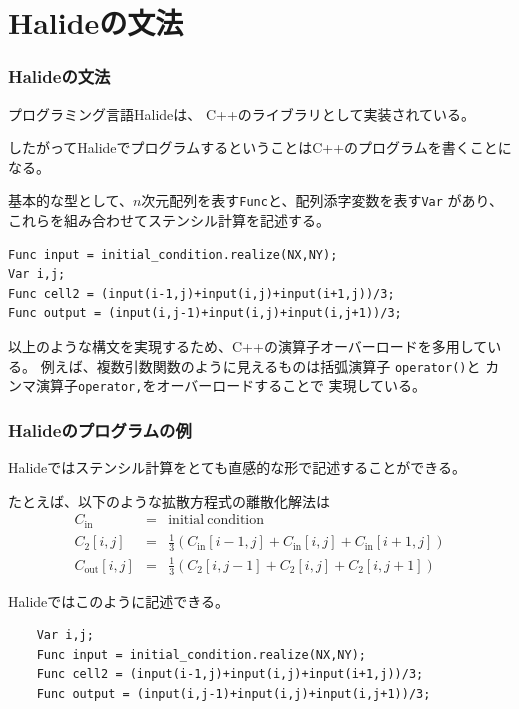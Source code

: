 \documentclass[dvipdfmx,cjk]{beamer}
\begin{document}
\section{Halideの文法} 
\begin{frame}[fragile]\frametitle{Halideの文法}

プログラミング言語Halideは、 C++のライブラリとして実装されている。

したがってHalideでプログラムするということはC++のプログラムを書くことになる。

基本的な型として、$n$次元配列を表す{\tt Func}と、配列添字変数を表す{\tt Var}
があり、これらを組み合わせてステンシル計算を記述する。

\pause

\begingroup
    \fontsize{8pt}{9pt}\selectfont
\begin{verbatim}
Func input = initial_condition.realize(NX,NY);
Var i,j;
Func cell2 = (input(i-1,j)+input(i,j)+input(i+1,j))/3;
Func output = (input(i,j-1)+input(i,j)+input(i,j+1))/3;
\end{verbatim}
\endgroup

\pause

以上のような構文を実現するため、C++の演算子オーバーロードを多用している。
例えば、複数引数関数のように見えるものは括弧演算子
{\tt operator()}と
カンマ演算子{\tt operator,}をオーバーロードすることで
実現している。

\end{frame}


\begin{frame}[fragile]\frametitle{Halideのプログラムの例}

Halideではステンシル計算をとても直感的な形で記述することができる。

\pause

たとえば、以下のような拡散方程式の離散化解法は
\begin{eqnarray}
C_\mathrm{in} &=& \mathrm{initial~condition} \\
C_2 [i,j] &=& \frac{1}{3}\left(C_\mathrm{in}[i-1,j] + C_\mathrm{in}[i,j] + C_\mathrm{in}[i+1,j]\right) \\
C_\mathrm{out} [i,j] &=& \frac{1}{3}\left(C_\mathrm{2}[i,j-1] + C_\mathrm{2}[i,j] + C_\mathrm{2}[i,j+1]\right)
\end{eqnarray}

\pause

Halideではこのように記述できる。
\begin{center}
\begingroup
    \fontsize{9pt}{10pt}\selectfont
\begin{verbatim}
    Var i,j;
    Func input = initial_condition.realize(NX,NY);
    Func cell2 = (input(i-1,j)+input(i,j)+input(i+1,j))/3;
    Func output = (input(i,j-1)+input(i,j)+input(i,j+1))/3;
\end{verbatim}
\endgroup
\end{center}

\end{frame}
\end{document}
